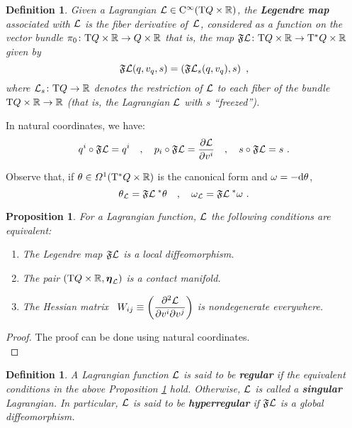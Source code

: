 \documentclass[12pt]{report}
\newtheorem{prop}[teor]{Proposition}
\newtheorem{definition}[teor]{Definition}
\def\dst{\displaystyle}
\def\derpar#1#2{\frac{\partial{#1}}{\partial{#2}}}
\def\qed{\ifvmode\removelastskip\fi
{\unskip\nobreak\hfil\penalty50\hbox{}\nobreak\hfil
\hbox{\vrule height1.2ex width1.2ex}\parfillskip=0pt
\finalhyphendemerits=0 \par\smallskip}}
\def\df{{\mit\Omega}}
\def\Lag{{\cal L}}
\def\d{{\rm d}}
\def\Real{\mathbb{R}}
\def\bmeta{\mbox{\boldmath $\eta$}}
\def\Tan{{\rm T}}
\def\Cinfty{{\rm C}^\infty}
\begin{document}
\begin{definition}
\label{legmap1}
Given a Lagrangian 
$\Lag\in\Cinfty(\Tan Q\times\Real)$, the {\sl \textbf{Legendre map}}
associated with $\Lag$ is the fiber derivative of~$\Lag$,
considered as a function on the vector bundle
$\pi_0 \colon\Tan Q\times\Real\to Q\times\Real$
that is, the map
$\mathfrak{F}\Lag\colon\Tan Q\times\Real \to\Tan^*Q\times\Real$ 
given by
$$
\mathfrak{F}\Lag (q,v_q,s) = \left(\mathfrak{F}\Lag_s (q,v_q),s\right)
\ ,
$$
where $\Lag_s\colon\Tan Q\to\Real$ denotes the restriction of $\Lag$ to each fiber of the bundle $\Tan Q\times\Real\to\Real$
(that is, the Lagrangian $\Lag$ with $s$ ``freezed'').
\end{definition}

In natural coordinates, we have:
$$
q^i \circ \mathfrak{F}\Lag = q^i \quad , \quad p_i \circ \mathfrak{F}\Lag =\derpar{\Lag}{v^i} \quad , \quad s \circ \mathfrak{F}\Lag = s \ .
$$

Observe that, if $\theta\in\df^1(\Tan^*Q\times\Real)$ 
is the canonical form and $\omega=-\d\theta$, 
$$
\theta_\Lag=\mathfrak{F}\Lag^{\;*}\theta\quad , \quad\omega_\Lag=\mathfrak{F}\Lag^{\;*}\omega\ .
$$

\begin{prop}
\label{Prop-regLag}
For a Lagrangian function, $\Lag$ the following conditions are equivalent:
\begin{enumerate}
\item
The Legendre map
$\mathfrak{F}\Lag$ is a local diffeomorphism.
\item 
The pair $(\Tan Q\times\Real,\bmeta_\Lag)$ is a contact manifold.
\item 
The Hessian matrix \ $\dst W_{ij}\equiv\left(\frac{\partial^2\Lag}{\partial v^i\partial v^j}\right)$ is nondegenerate everywhere.
\end{enumerate}
\end{prop}
\begin{proof}
The proof can be done using natural coordinates.
\\ \qed\end{proof}

\begin{definition}
A Lagrangian function $\Lag$ is said to be {\sl\textbf{regular}} if the equivalent
conditions in the above Proposition \ref{Prop-regLag} hold.
Otherwise, $\Lag$ is called a {\sl\textbf{singular}} Lagrangian.
In particular, 
$\Lag$ is said to be {\sl\textbf{hyperregular}} 
if $\mathfrak{F}\Lag$ is a global diffeomorphism.
\end{definition}
\end{document}
